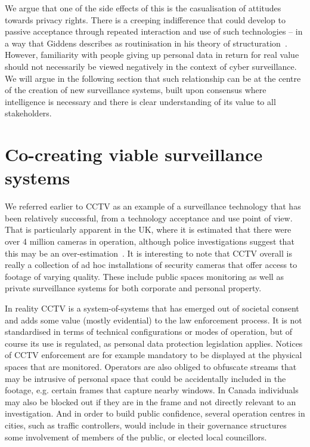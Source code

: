 \documentclass{llncs}
\begin{document}
We argue that one of the side effects of this is the casualisation of attitudes towards privacy rights. There is a creeping indifference that could develop to passive acceptance through repeated interaction and use of such technologies -- in a way that Giddens describes as routinisation in his theory of structuration~\cite{Giddens}. However, familiarity with people giving up personal data in return for real value should not necessarily be viewed negatively in the context of cyber surveillance. We will argue in the following section that such relationship can be at the centre of the creation of new surveillance systems, built upon consensus where intelligence is necessary and there is clear understanding of its value to all stakeholders.

\section{Co-creating viable surveillance systems}
\label{sec:Creating}

We referred earlier to CCTV as an example of a surveillance technology that has been relatively successful, from a technology acceptance and use point of view. That is particularly apparent in the UK, where it is estimated that there were over 4 million cameras in operation, although police investigations suggest that this may be an over-estimation~\cite{HomeOffice}. It is interesting to note that CCTV overall is really a collection of ad hoc installations of security cameras that offer access to footage of varying quality. These include public spaces monitoring as well as private surveillance systems for both corporate and personal property.

In reality CCTV is a system-of-systems that has emerged out of societal consent and adds some value (mostly evidential) to the law enforcement process. It is not standardised in terms of technical configurations or modes of operation, but of course its use is regulated, as personal data protection legislation applies. Notices of CCTV enforcement are for example mandatory to be displayed at the physical spaces that are monitored. Operators are also obliged to obfuscate streams that may be intrusive of personal space that could be accidentally included in the footage, e.g. certain frames that capture nearby windows. In Canada individuals may also be blocked out if they are in the frame and not directly relevant to an investigation. And in order to build public confidence, several operation centres in cities, such as traffic controllers, would include in their governance structures some involvement of members of the public, or elected local councillors.
\end{document}
